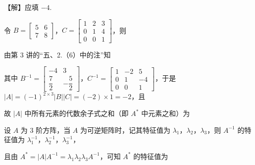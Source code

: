 【解】应填 $-4$.

令 $B=\begin{bmatrix}5&6\\7&8\end{bmatrix}$，$C=\begin{bmatrix}1&2&3\\0&1&4\\0&0&1\end{bmatrix}$，则

由第 3 讲的“五、2.（6）中的注”知

其中 $B^{-1}=\begin{bmatrix}-4&3\\ \dfrac{7}{2}&-\dfrac{5}{2}\end{bmatrix}$，$C^{-1}=\begin{bmatrix}1&-2&5\\0&1&-4\\0&0&1\end{bmatrix}$，于是 $|A|=(-1)^{2\times3}|B||C|=(-2)\times1=-2$，且

故 $|A|$ 中所有元素的代数余子式之和（即 $A^{*}$ 中元素之和）为


设 $A$ 为 3 阶方阵，当 $A$ 为可逆矩阵时，记其特征值为 $\lambda_1$，$\lambda_2$，$\lambda_3$，则 $A^{-1}$ 的特征值为 $\lambda_1^{-1}$，$\lambda_2^{-1}$，$\lambda_3^{-1}$，

且由 $A^{*}=|A|A^{-1}=\lambda_1\lambda_2\lambda_3A^{-1}$，可知 $A^{*}$ 的特征值为

